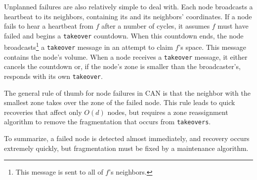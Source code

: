 Unplanned failures are also relatively simple to deal with.
Each node broadcasts a heartbeat to its neighbors, containing its and its neighbors' coordinates.
If a node fails to hear a heartbeat from $f$ after a number of cycles, it assumes $f$ must have failed and begins a \texttt{takeover} countdown.
When this countdown ends, the node broadcasts\footnote{This message is sent to all of $f$'s neighbors.} a \texttt{takeover} message in an attempt to claim $f$'s space.
This message contains the node's volume.
When a node receives a \texttt{takeover} message, it either cancels the countdown or, if the node's zone is smaller than the broadcaster's, responds with its own \texttt{takeover}.

The general rule of thumb for node failures in CAN is that the neighbor with the smallest zone takes over the zone of the failed node.
This rule leads to quick recoveries that affect only $O(d)$ nodes, but requires a zone reassignment algorithm to remove the fragmentation that occurs from \texttt{takeovers}.

To summarize, a failed node is detected almost immediately, and recovery occurs extremely quickly, but fragmentation must be fixed by a maintenance algorithm.













